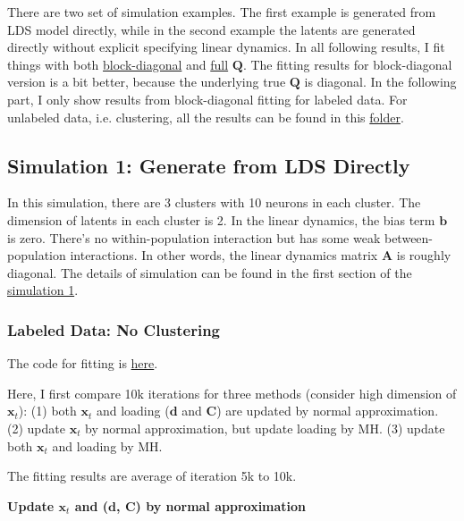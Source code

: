 \documentclass[]{article}
\begin{document}
There are two set of simulation examples. The first example is generated from LDS model directly, while in the second example the latents are generated directly without explicit specifying linear dynamics. In all following results, I fit things with both \href{https://github.com/weigcdsb/state-space-clustering/tree/main/LDS/blkDiag}{block-diagonal} and \href{https://github.com/weigcdsb/state-space-clustering/tree/main/LDS/full}{full} \(\mathbf{Q}\). The fitting results for block-diagonal version is a bit better, because the underlying true \(\mathbf{Q}\) is diagonal. In the following part, I only show results from block-diagonal fitting for labeled data. For unlabeled data, i.e. clustering, all the results can be found in this \href{https://github.com/weigcdsb/state-space-clustering/tree/main/results/gif}{folder}.

\subsection{Simulation 1: Generate from LDS Directly}
In this simulation, there are 3 clusters with 10 neurons in each cluster. The dimension of latents in each cluster is 2. In the linear dynamics, the bias term \(\mathbf{b}\) is zero. There's no within-population interaction but has some weak between-population interactions. In other words, the linear dynamics matrix \(\mathbf{A}\) is roughly diagonal. The details of simulation can be found in the first section of the \href{https://github.com/weigcdsb/state-space-clustering/blob/main/LDS/blkDiag/lds_sample_DP_blkDiag.m}{simulation 1}.

\subsubsection{Labeled Data: No Clustering}
The code for fitting is \href{https://github.com/weigcdsb/state-space-clustering/blob/main/LDS/blkDiag/lds_sample_DP_blkDiag.m}{here}. 

Here, I first compare 10k iterations for three methods (consider high dimension of \(\mathbf{x}_t\)): (1) both \(\mathbf{x}_t\) and loading (\(\mathbf{d}\) and \(\mathbf{C}\)) are updated by normal approximation. (2) update \(\mathbf{x}_t\) by normal approximation, but update loading by MH. (3) update both \(\mathbf{x}_t\) and loading by MH.

The fitting results are average of iteration 5k to 10k.

\textbf{Update \(\mathbf{x}_t\) and (\(\mathbf{d}\), \(\mathbf{C}\)) by normal approximation}
\end{document}
